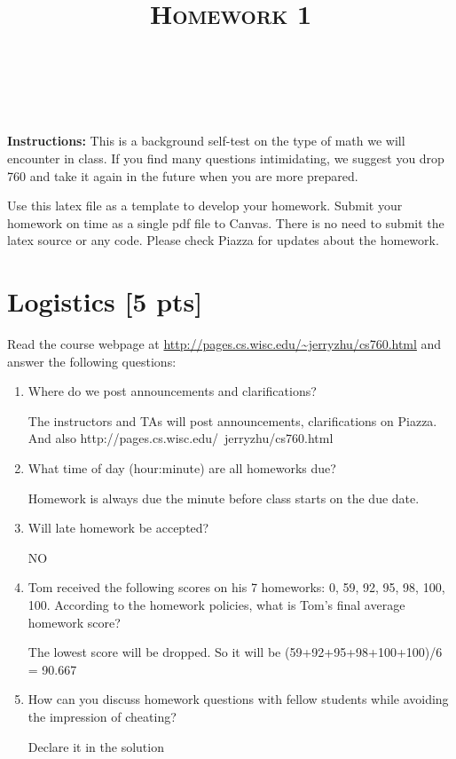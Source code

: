 \documentclass[a4paper]{article}
\title{\textsc{Homework 1}} %
\author{
\red{$>>$Sean(Xiaoyu) Sun$<<$} \\
\red{$>>$9078202463$<<$}\\
}
\date{}
\theoremstyle{definition}
\newenvironment{soln}{
    \leavevmode\color{blue}\ignorespaces
}{}
\begin{document}
\maketitle 


\textbf{Instructions:} 
This is a background self-test on the type of math we will encounter in class. If you find many questions intimidating, we suggest you drop 760 and take it again in the future when you are more prepared.

Use this latex file as a template to develop your homework.
Submit your homework on time as a single pdf file to Canvas.
There is no need to submit the latex source or any code.
Please check Piazza for updates about the homework.


\section{Logistics [5 pts]}
Read the course webpage at \url{http://pages.cs.wisc.edu/~jerryzhu/cs760.html} and answer the following questions:
\begin{enumerate}
\item Where do we post announcements and clarifications?

\begin{soln}  The instructors and TAs will post announcements, clarifications on Piazza. And also http://pages.cs.wisc.edu/~jerryzhu/cs760.html \end{soln}

\item What time of day (hour:minute) are all homeworks due?

\begin{soln} Homework is always due the minute before class starts on the due date.\end{soln}

\item Will late homework be accepted?

\begin{soln} NO \end{soln}

\item Tom received the following scores on his 7 homeworks: 0, 59, 92, 95, 98, 100, 100.  According to the homework policies, what is Tom's final average homework score?

\begin{soln} The lowest score will be dropped. So it will be (59+92+95+98+100+100)/6 = 90.667 \end{soln}

\item How can you discuss homework questions with fellow students while avoiding the impression of cheating?

\begin{soln} Declare it in the solution \end{soln}
\end{enumerate}
\end{document}
